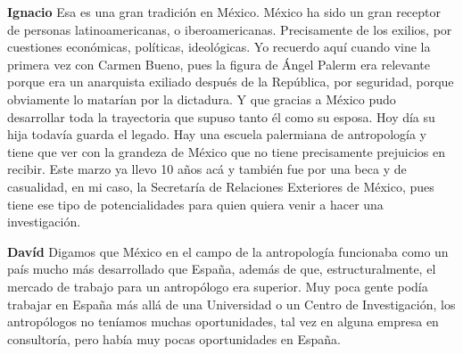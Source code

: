 \documentclass[
  spanish,
  11pt,
  a4paper,
]{scrbook}
\newenvironment{transcripcion}{
    \begin{list}{}{
        \setlength{\leftmargin}{1.5em}  %
        \setlength{\rightmargin}{0em}
        \setlength{\itemsep}{0.2em}     %
        \setlength{\parsep}{0.0em}
        \setlength{\listparindent}{0pt}
    }
}{
    \end{list}
}
\newcommand{\personaje}[1]{\textbf{#1}\quad}
\begin{document}
\begin{transcripcion}
\item \personaje{Ignacio} Esa es una gran tradición en México. México ha sido un gran receptor de personas latinoamericanas, o iberoamericanas. Precisamente de los exilios, por cuestiones económicas, políticas, ideológicas. Yo recuerdo aquí cuando vine la primera vez con Carmen Bueno, pues la figura de Ángel Palerm era relevante porque era un anarquista exiliado después de la República, por seguridad, porque obviamente lo matarían por la dictadura. Y que gracias a México pudo desarrollar toda la trayectoria que supuso tanto él como su esposa. Hoy día su hija todavía guarda el legado. Hay una escuela palermiana de antropología y tiene que ver con la grandeza de México que no tiene precisamente prejuicios en recibir. Este marzo ya llevo 10 años acá y también fue por una beca y de casualidad, en mi caso, la Secretaría de Relaciones Exteriores de México, pues tiene ese tipo de potencialidades para quien quiera venir a hacer una investigación.

\item \personaje{Davíd} Digamos que México en el campo de la antropología funcionaba como un país mucho más desarrollado que España, además de que, estructuralmente, el mercado de trabajo para un antropólogo era superior. Muy poca gente podía trabajar en España más allá de una Universidad o un Centro de Investigación, los antropólogos no teníamos muchas oportunidades, tal vez en alguna empresa en consultoría, pero había muy pocas oportunidades en España.


\end{transcripcion}
\end{document}
